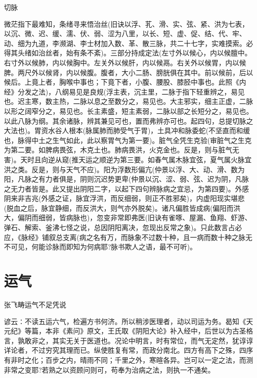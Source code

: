 \documentclass[a4paper,12pt,UTF8,twoside]{ctexbook}
\begin{document}
	切脉

	微茫指下最难知，条绪寻来悟治丝(旧诀以浮、芤、滑、实、弦、紧、洪为七表，以沉、微、迟、缓、濡、伏、弱、涩为八里，以长、短、虚、促、结、代、牢、动、细为九道，李濒湖、李士材加入数、革、散三脉，共二十七字，实难摸索。必得其头绪如治丝者，始有条不紊)。三部分持成定法(左寸外以候心，内以候膻中。右寸外以候肺，内以候胸中。左关外以候肝，内以候鬲。右关外以候胃，内以候脾。两尺外以候肾，内以候腹。腹者，大小二肠、膀胱俱在其中。前以候前，后以候后。上竟上者，胸喉中事也；下竟下者，小腹、腰股、膝胫中事也。此照《内经》分发之法)，八纲易见是良规(浮主表，沉主里，二脉于指下轻重辨之，易见也。迟主寒，数主热，二脉以息之至数分之，易见也。大主邪实，细主正虚，二脉以形之阔窄分之，易见也。长主素盛，短主素弱，二脉以部之长短分之，易见也。以此八脉为纲。其余诸脉，辨其兼见可也，置而弗辨亦可也。起四句，总提切脉之大法也)。胃资水谷人根本(脉属肺而肺受气于胃)，土具冲和脉委蛇(不坚直而和缓也，脉得中土之生气如此，此以察胃气为第一要)。脏气全凭生克验(审脏气之生克为第二要。如脾病畏弦，木克土也。肺病畏洪，火克金也。反是，则与脏气无害)。天时且向逆从窥(推天运之顺逆为第三要。如春气属木脉宜弦，夏气属火脉宜洪之类。反是，则与天气不应)。阳为浮数形偏亢(仲景以浮、大、动、滑、数为阳，凡脉之有力者俱是，阴则沉迟势更卑(仲景以沉、涩、弱、弦、迟为阴，凡脉之无力者皆是。此又提出阴阳二字，以起下四句辨脉病之宜忌，为第四要)。外感阴来非吉兆(外感之证，脉宜浮洪，而反细弱，则正不胜邪矣)，内虚阳现实堪悲(脱血之后，脉宜静细，而反洪大，则气亦外脱矣)。诸凡偏胜皆成病(偏阳而洪大，偏阴而细弱，皆病脉也)，忽变非常即弗医(旧诀有雀啄、屋漏、鱼翔、虾游、弹石、解索、釜沸七怪之说，总因阴阳离决，忽现出反常之象)。只此数言占必应，《脉经》铺叙总支离(病之名有万，而脉象不过数十种，且一病而数十种之脉无不可见，何能诊脉而即知为何病耶?脉书欺人之语，最不可听)。
	
	\chapter{运气}
	张飞畴运气不足凭说

	谚云∶不读五运六气，检遍方书何济。所以稍涉医理者，动以司运为务。曷知《天元纪》等篇，本非《素问》原文，王氏取《阴阳大论》补入经中，后世以为古圣格言，孰敢非之，其实无关于医道也。况论中明言，时有常位，而气无定然，犹谆谆详论者，不过穷究其理而已。纵使胜复有常，而政分南北。四方有高下之殊，四序有非时之化；百步之内，晴雨不同；千里之外，寒暄各异。岂可以一定之法，而测非常之变耶?若熟之以资顾问则可，苟奉为治病之法，则执一不通矣。
\end{document}
